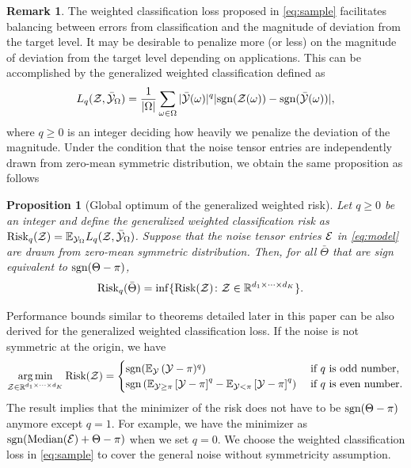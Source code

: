 \documentclass[twoside,11pt]{article}
\theoremstyle{plain}
\newtheorem{prop}{Proposition}
\theoremstyle{definition}
\newtheorem{rmk}{Remark}
\def\sign{\textup{sgn}}
\def\risk{\textup{Risk}}
\begin{document}
\begin{rmk}
The weighted classification loss proposed in \eqref{eq:sample} facilitates balancing between errors from classification and the magnitude of deviation from the target level.  It may be desirable to penalize more (or less) on the magnitude of deviation from the target level depending on applications. This can be accomplished by the generalized weighted classification defined as 
\begin{align}\label{eq:gsample}
     L_q(\tZ,\bar\tY_\Omega) = \frac{1}{|\Omega|}\sum_{\omega\in\Omega}|\bar\tY(\omega)|^q|\sign(\tZ(\omega))-\sign(\bar\tY(\omega))|,
\end{align}
where $q\geq 0$ is an integer deciding how heavily we penalize the deviation of the magnitude. Under the condition that the noise tensor entries are independently drawn from zero-mean symmetric distribution, we obtain the same proposition as follows
\begin{prop}[Global optimum of the generalized weighted risk]\label{prop:global2}
Let $q \geq 0$ be an integer and define the generalized weighted classification risk as $\risk_q(\tZ) = \mathbb{E}_{\tY_\Omega}L_q(\tZ,\bar\tY_\Omega)$. Suppose that the noise tensor entries $\mathcal{E}$ in \eqref{eq:model} are drawn from zero-mean symmetric distribution. Then, for all $\bar \Theta$ that are sign equivalent to $\sign(\Theta-\pi)$, 
\begin{align}\label{eq:optimal}
\textup{Risk}_q(\bar \Theta )&=\inf\{\textup{Risk}(\mathcal{Z})\colon \mathcal{Z}\in\mathbb{R}^{d_1\times \cdots \times d_K}\}.
\end{align}
\end{prop}
Performance bounds similar to theorems detailed later in this paper can be also derived for the generalized weighted classification loss. 
If the noise is not symmetric at the origin, we have \begin{align}
    \argmin_{ \tZ\in\mathbb{R}^{d_1\times \cdots \times d_K}}\textup{Risk}(\tZ) = \begin{cases}\sign(\mathbb{E}_{\tY}\left(\tY-\pi)^q\right)& \text{ if $q$ is odd number},\\ \sign\left(\mathbb{E}_{\tY\geq \pi}\left[\tY-\pi\right]^q-\mathbb{E}_{\tY< \pi}\left[\tY-\pi\right]^q\right)&\text{ if $q$ is even number.}
    \end{cases}
\end{align}
The result implies that the minimizer of the risk does not have to be $\sign(\Theta-\pi)$ anymore except $q = 1$.
For example, we have the minimizer as $\text{sgn}(\text{Median}(\mathcal{E})+\Theta-\pi)$ when we set $q = 0$.  
We choose the weighted classification loss in \eqref{eq:sample} to cover the general noise without symmetricity assumption.
\end{rmk}
\end{document}
